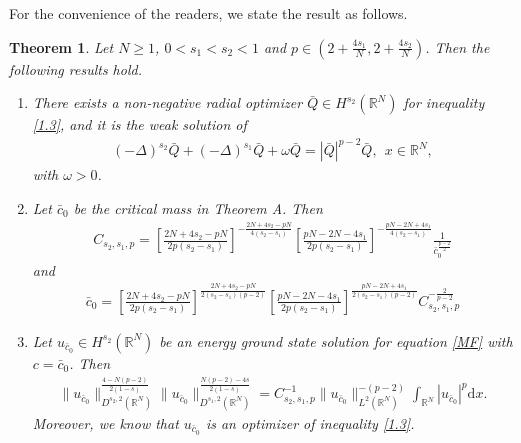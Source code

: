 \documentclass[12pt,a4paper,reqno]{amsart}
\numberwithin{equation}{section}
\newtheorem{theorem}{Theorem}[section]
\begin{document}
For the convenience of the readers,
we state the result as follows.
\begin{theorem}\label{Theorem1.6}
Let $N\geqslant1$,
$0<s_{1}<s_{2}<1$
and $p\in(2+\frac{4s_{1}}{N},2+\frac{4s_{2}}{N})$.
Then the following results hold.
\begin{enumerate}
\item
There exists a non-negative radial optimizer $\bar{Q}\in H^{s_{2}}(\mathbb{R}^{N})$ for inequality \eqref{1.3}, and it is the weak solution of
\begin{equation*}
\begin{aligned}
(-\Delta)^{s_{2}} \bar{Q}
+(-\Delta)^{s_{1}}\bar{Q}+\omega \bar{Q}=|\bar{Q}|^{p-2}\bar{Q}, \ \ x\in \mathbb{R}^{N},
\end{aligned}
\end{equation*}
with $\omega>0$.
\item
Let $\bar{c}_{0}$ be the critical mass in Theorem A.
Then
\begin{equation*}
\begin{aligned}
C_{s_{2},s_{1},p}
=
\left[
\frac{2N+4s_{2}-pN}{2p(s_{2}-s_{1})}
\right]^{-\frac{2N+4s_{2}-pN}{4(s_{2}-s_{1})}}
\left[
\frac{pN-2N-4s_{1}}{2p(s_{2}-s_{1})}
\right]^{-\frac{pN-2N+4s_{1}}{4(s_{2}-s_{1})}}
\frac{1}{\bar{c}_{0}^{\frac{p-2}{2}}}
\end{aligned}
\end{equation*}
and
\begin{equation*}
\begin{aligned}
\bar{c}_{0}
=
\left[
\frac{2N+4s_{2}-pN}{2p(s_{2}-s_{1})}
\right]^{\frac{2N+4s_{2}-pN}{2(s_{2}-s_{1})(p-2)}}
\left[
\frac{pN-2N-4s_{1}}{2p(s_{2}-s_{1})}
\right]^{\frac{pN-2N+4s_{1}}{2(s_{2}-s_{1})(p-2)}}
C_{s_{2},s_{1},p}^{-\frac{2}{p-2}}
\end{aligned}
\end{equation*}
\item
Let $u_{\bar{c}_{0}}\in H^{s_{2}}(\mathbb{R}^{N})$ be an energy ground state solution for equation \eqref{MF} with $c=\bar{c}_{0}$.
Then
\begin{equation*}
\begin{aligned}
\|u_{\bar{c}_{0}}\|_{D^{s_{2},2}(\mathbb{R}^{N})}^{\frac{4-N(p-2)}{2(1-s)}}
\|u_{\bar{c}_{0}}\|_{D^{s_{1},2}(\mathbb{R}^{N})}^{\frac{N(p-2)-4s}{2(1-s)}}
=C_{s_{2},s_{1},p}^{-1}\|u_{\bar{c}_{0}}\|_{L^{2}(\mathbb{R}^{N})}^{-(p-2)}
\int_{\mathbb{R}^{N}}
|u_{\bar{c}_{0}}|^{p}
\mathrm{d}x.
\end{aligned}
\end{equation*}
Moreover,
we know that $u_{\bar{c}_{0}}$ is an optimizer of inequality \eqref{1.3}.
\end{enumerate}
\end{theorem}
\end{document}
